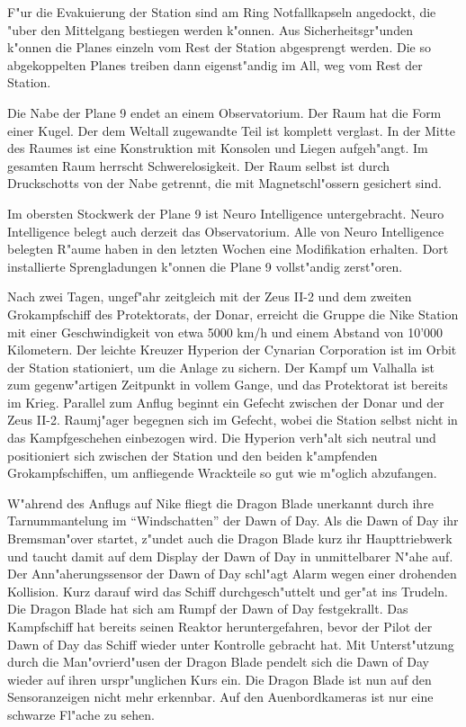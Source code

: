 F"ur die Evakuierung der Station sind am Ring Notfallkapseln angedockt, die "uber den Mittelgang bestiegen werden k"onnen. Aus Sicherheitsgr"unden k"onnen die Planes einzeln vom Rest der Station abgesprengt werden. Die so abgekoppelten Planes treiben dann eigenst"andig im All, weg vom Rest der Station.

Die Nabe der Plane 9 endet an einem Observatorium. Der Raum hat die Form einer Kugel. Der dem Weltall zugewandte Teil ist komplett verglast. In der Mitte des Raumes ist eine Konstruktion mit Konsolen und Liegen aufgeh"angt. Im gesamten Raum herrscht Schwerelosigkeit. Der Raum selbst ist durch Druckschotts von der Nabe getrennt, die mit Magnetschl"ossern gesichert sind.

Im obersten Stockwerk der Plane 9 ist Neuro Intelligence untergebracht. Neuro Intelligence belegt auch derzeit das Observatorium. Alle von Neuro Intelligence belegten R"aume haben in den letzten Wochen eine Modifikation erhalten. Dort installierte Sprengladungen k"onnen die Plane 9 vollst"andig zerst"oren.


Nach zwei Tagen, ungef"ahr zeitgleich mit der Zeus II-2 und dem zweiten Gro\3kampfschiff des Protektorats, der Donar, erreicht die Gruppe die Nike Station mit einer Geschwindigkeit von etwa 5000 km/h und einem Abstand von 10'000 Kilometern. Der leichte Kreuzer Hyperion der Cynarian Corporation ist im Orbit der Station stationiert, um die Anlage zu sichern. Der Kampf um Valhalla ist zum gegenw"artigen Zeitpunkt in vollem Gange, und das Protektorat ist bereits im Krieg. Parallel zum Anflug beginnt ein Gefecht zwischen der Donar und der Zeus II-2. Raumj"ager begegnen sich im Gefecht, wobei die Station selbst nicht in das Kampfgeschehen einbezogen wird. Die Hyperion verh"alt sich neutral und positioniert sich zwischen der Station und den beiden k"ampfenden Gro\3kampfschiffen, um anfliegende Wrackteile so gut wie m"oglich abzufangen.

W"ahrend des Anflugs auf Nike fliegt die Dragon Blade unerkannt durch ihre Tarnummantelung im ``Windschatten'' der Dawn of Day. Als die Dawn of Day ihr Bremsman"over startet, z"undet auch die Dragon Blade kurz ihr Haupttriebwerk und taucht damit auf dem Display der Dawn of Day in unmittelbarer N"ahe auf. Der Ann"aherungssensor der Dawn of Day schl"agt Alarm wegen einer drohenden Kollision. Kurz darauf wird das Schiff durchgesch"uttelt und ger"at ins Trudeln. Die Dragon Blade hat sich am Rumpf der Dawn of Day festgekrallt. Das Kampfschiff hat bereits seinen Reaktor heruntergefahren, bevor der Pilot der Dawn of Day das Schiff wieder unter Kontrolle gebracht hat. Mit Unterst"utzung durch die Man"ovrierd"usen der Dragon Blade pendelt sich die Dawn of Day wieder auf ihren urspr"unglichen Kurs ein. Die Dragon Blade ist nun auf den Sensoranzeigen nicht mehr erkennbar. Auf den Au\3enbordkameras ist nur eine schwarze Fl"ache zu sehen.

